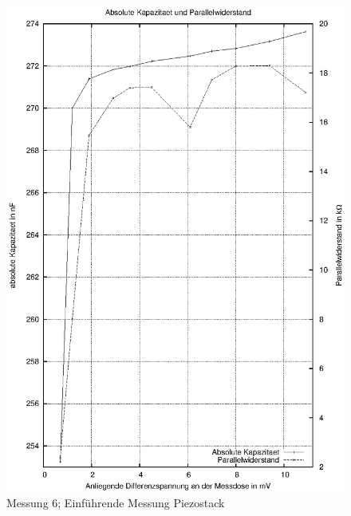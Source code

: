 \documentclass[11pt]{scrreprt} %
\begin{document}
\begin {figure}[htbp]
      \begin{center}
        \includegraphics{tabelle2_2_1}
      \end{center}
\caption{Messung 6; Einführende Messung Piezostack}
\label{fig:2.6}
\end{figure}

\newpage
\end{document}
